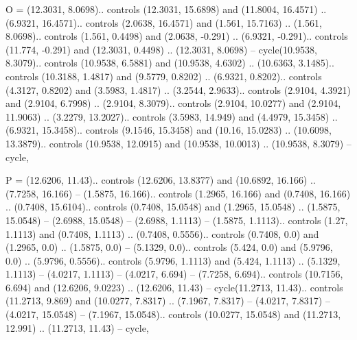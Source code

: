 O = {(12.3031, 8.0698).. controls (12.3031, 15.6898) and (11.8004, 16.4571) .. (6.9321, 16.4571).. controls (2.0638, 16.4571) and (1.561, 15.7163) .. (1.561, 8.0698).. controls (1.561, 0.4498) and (2.0638, -0.291) .. (6.9321, -0.291).. controls (11.774, -0.291) and (12.3031, 0.4498) .. (12.3031, 8.0698) -- cycle(10.9538, 8.3079).. controls (10.9538, 6.5881) and (10.9538, 4.6302) .. (10.6363, 3.1485).. controls (10.3188, 1.4817) and (9.5779, 0.8202) .. (6.9321, 0.8202).. controls (4.3127, 0.8202) and (3.5983, 1.4817) .. (3.2544, 2.9633).. controls (2.9104, 4.3921) and (2.9104, 6.7998) .. (2.9104, 8.3079).. controls (2.9104, 10.0277) and (2.9104, 11.9063) .. (3.2279, 13.2027).. controls (3.5983, 14.949) and (4.4979, 15.3458) .. (6.9321, 15.3458).. controls (9.1546, 15.3458) and (10.16, 15.0283) .. (10.6098, 13.3879).. controls (10.9538, 12.0915) and (10.9538, 10.0013) .. (10.9538, 8.3079) -- cycle},

P = {(12.6206, 11.43).. controls (12.6206, 13.8377) and (10.6892, 16.166) .. (7.7258, 16.166) -- (1.5875, 16.166).. controls (1.2965, 16.166) and (0.7408, 16.166) .. (0.7408, 15.6104).. controls (0.7408, 15.0548) and (1.2965, 15.0548) .. (1.5875, 15.0548) -- (2.6988, 15.0548) -- (2.6988, 1.1113) -- (1.5875, 1.1113).. controls (1.27, 1.1113) and (0.7408, 1.1113) .. (0.7408, 0.5556).. controls (0.7408, 0.0) and (1.2965, 0.0) .. (1.5875, 0.0) -- (5.1329, 0.0).. controls (5.424, 0.0) and (5.9796, 0.0) .. (5.9796, 0.5556).. controls (5.9796, 1.1113) and (5.424, 1.1113) .. (5.1329, 1.1113) -- (4.0217, 1.1113) -- (4.0217, 6.694) -- (7.7258, 6.694).. controls (10.7156, 6.694) and (12.6206, 9.0223) .. (12.6206, 11.43) -- cycle(11.2713, 11.43).. controls (11.2713, 9.869) and (10.0277, 7.8317) .. (7.1967, 7.8317) -- (4.0217, 7.8317) -- (4.0217, 15.0548) -- (7.1967, 15.0548).. controls (10.0277, 15.0548) and (11.2713, 12.991) .. (11.2713, 11.43) -- cycle},

